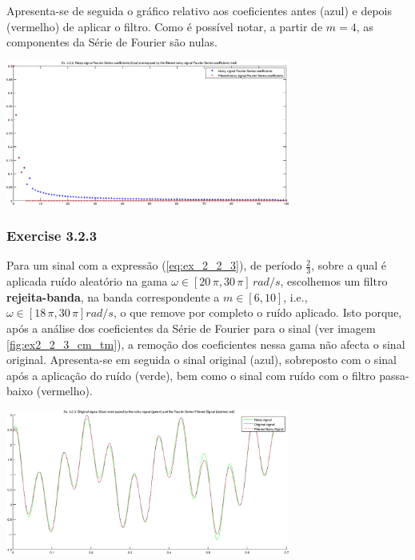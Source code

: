 \documentclass[a4paper]{article}
\begin{document}
\clearpage
\noindent Apresenta-se de seguida o gráfico relativo aos coeficientes antes (azul) e depois (vermelho) de aplicar o filtro. Como é possível notar, a partir de $m = 4$, as componentes da Série de Fourier são nulas.
\begin{center}
	\includegraphics[width=0.70\textwidth]{images/ex3_2_2_coeffs.png}
	\label{fig:ex3_2_2_coeffs}
\end{center}

\subsubsection{Exercise 3.2.3}
\noindent Para um sinal com a expressão (\ref{eq:ex_2_2_3}), de período $\frac{2}{3}$, sobre a qual é aplicada ruído aleatório na gama $\omega \in [20 \, \pi, 30 \, \pi] \, rad/s$, escolhemos um filtro \textbf{rejeita-banda}, na banda correspondente a $m \in [6, 10]$, i.e., $\omega \in [18 \, \pi, 30 \, \pi] rad/s$, o que remove por completo o ruído aplicado. Isto porque, após a análise dos coeficientes da Série de Fourier para o sinal (ver imagem \ref{fig:ex2_2_3_cm_tm}), a remoção dos coeficientes nessa gama não afecta o sinal original. Apresenta-se em seguida o sinal original (azul), sobreposto com o sinal após a aplicação do ruído (verde), bem como o sinal com ruído com o filtro passa-baixo (vermelho).

\begin{center}
	\includegraphics[width=0.70\textwidth]{images/ex3_2_3_plot.png}
	\label{fig:ex3_2_3_plot}
\end{center}
\end{document}
